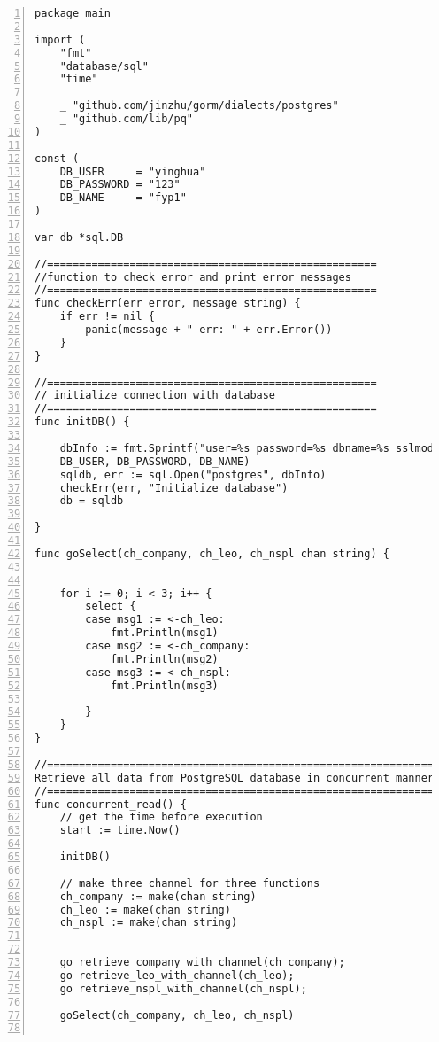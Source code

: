 \lstset{basicstyle=\ttfamily\tiny}  
\begin{lstlisting}[breaklines, frame=single, numbers=left, caption={Main function for concurrent execution. (main.go)}, label=commandline-02]
package main

import (
	"fmt"
	"database/sql"
	"time"
	
	_ "github.com/jinzhu/gorm/dialects/postgres"
	_ "github.com/lib/pq"
)

const (
	DB_USER     = "yinghua"
	DB_PASSWORD = "123"
	DB_NAME     = "fyp1"
)

var db *sql.DB

//====================================================
//function to check error and print error messages
//====================================================
func checkErr(err error, message string) {
	if err != nil {
		panic(message + " err: " + err.Error())
	}
}

//====================================================
// initialize connection with database
//====================================================
func initDB() {

	dbInfo := fmt.Sprintf("user=%s password=%s dbname=%s sslmode=disable",
	DB_USER, DB_PASSWORD, DB_NAME)
	sqldb, err := sql.Open("postgres", dbInfo)
	checkErr(err, "Initialize database")
	db = sqldb
	
}

func goSelect(ch_company, ch_leo, ch_nspl chan string) {
	
	
	for i := 0; i < 3; i++ {
		select {
		case msg1 := <-ch_leo:
			fmt.Println(msg1)
		case msg2 := <-ch_company:
			fmt.Println(msg2)
		case msg3 := <-ch_nspl:
			fmt.Println(msg3)
		
		}
	}
}

//==============================================================
Retrieve all data from PostgreSQL database in concurrent manner 
//==============================================================
func concurrent_read() {
	// get the time before execution
	start := time.Now()
	
	initDB()
	
	// make three channel for three functions
	ch_company := make(chan string)
	ch_leo := make(chan string)
	ch_nspl := make(chan string)
	
	
	go retrieve_company_with_channel(ch_company);
	go retrieve_leo_with_channel(ch_leo);
	go retrieve_nspl_with_channel(ch_nspl);
	
	goSelect(ch_company, ch_leo, ch_nspl) 
	

\end{lstlisting}
